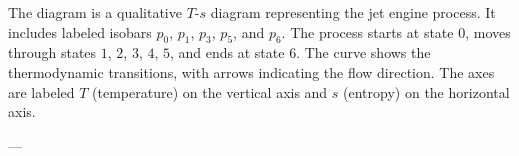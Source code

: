The diagram is a qualitative \( T \)-\( s \) diagram representing the jet engine process. It includes labeled isobars \( p_0 \), \( p_1 \), \( p_3 \), \( p_5 \), and \( p_6 \). The process starts at state \( 0 \), moves through states \( 1 \), \( 2 \), \( 3 \), \( 4 \), \( 5 \), and ends at state \( 6 \). The curve shows the thermodynamic transitions, with arrows indicating the flow direction. The axes are labeled \( T \) (temperature) on the vertical axis and \( s \) (entropy) on the horizontal axis.

---